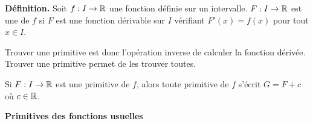\documentclass[10pt,class=article,crop=false]{standalone}
\begin{document}
\begin{multicols}{2}
\textbf{Définition.}
Soit $f:I \to \mathbb{R}$ une fonction définie sur un intervalle.
$F : I \to \mathbb{R}$ est une  de $f$ si
$F$ est une fonction dérivable sur $I$ vérifiant $F'(x)=f(x)$ pour tout $x \in I$.

Trouver une primitive est donc l'opération inverse de calculer la fonction dérivée.
Trouver une primitive permet de les trouver toutes.

\begin{proposition}
\label{prop:primitunic}
Si $F : I \to \mathbb{R}$ est une primitive de $f$, alors toute primitive de $f$ s'écrit $G=F+c$ où $c\in \mathbb{R}$.
\end{proposition}



\textbf{Primitives des fonctions usuelles}



\end{multicols}
\end{document}
